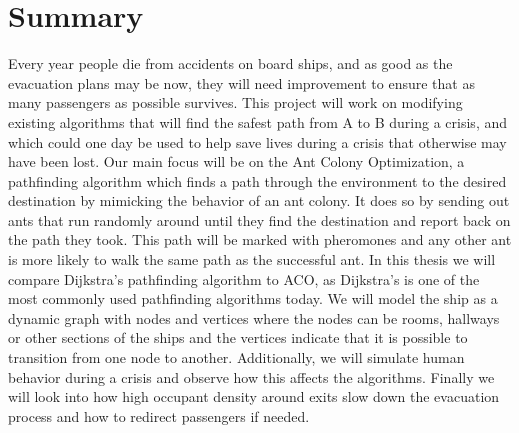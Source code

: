 \chapter{Summary}
\label{ch:summary}


Every year people die from accidents on board ships, and as good as the evacuation plans may be now, they will need improvement to ensure that as many passengers as possible survives. This project will work on modifying existing algorithms that will find the safest path from A to B during a crisis, and which could one day be used to help save lives during a crisis that otherwise may have been lost. Our main focus will be on the Ant Colony Optimization, a pathfinding algorithm which finds a path through the environment to the desired destination by mimicking the behavior of an ant colony. It does so by sending out ants that run randomly around until they find the destination and report back on the path they took. This path will be marked with pheromones and any other ant is more likely to walk the same path as the successful ant. In this thesis we will compare Dijkstra's pathfinding algorithm to ACO, as Dijkstra's is one of the most commonly used pathfinding algorithms today. We will model the ship as a dynamic graph with nodes and vertices where the nodes can be rooms, hallways or other sections of the ships and the vertices indicate that it is possible to transition from one node to another. Additionally, we will simulate human behavior during a crisis and observe how this affects the algorithms. Finally we will look into how high occupant density around exits slow down the evacuation process and how to redirect passengers if needed.